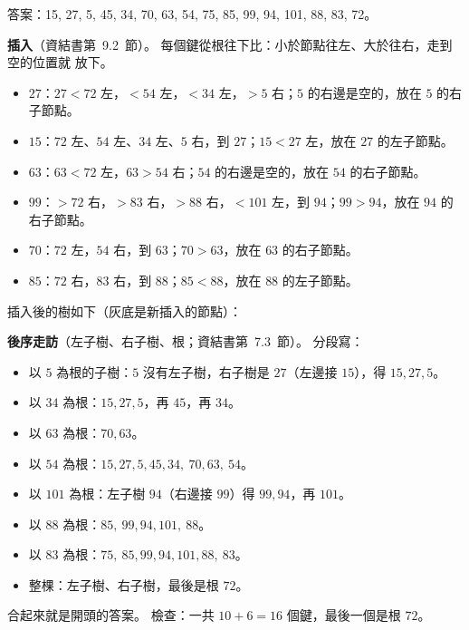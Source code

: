 \begin{pastsoln}
答案：15, 27, 5, 45, 34, 70, 63, 54, 75, 85, 99, 94, 101, 88, 83, 72。

\textbf{插入}（資結書第~9.2~節）。 每個鍵從根往下比：小於節點往左、大於往右，走到空的位置就
放下。
\begin{itemize}
\item $27$：$27 < 72$ 左，$< 54$ 左，$< 34$ 左，$> 5$ 右；$5$ 的右邊是空的，放在 $5$ 的右子節點。
\item $15$：$72$ 左、$54$ 左、$34$ 左、$5$ 右，到 $27$；$15 < 27$ 左，放在 $27$ 的左子節點。
\item $63$：$63 < 72$ 左，$63 > 54$ 右；$54$ 的右邊是空的，放在 $54$ 的右子節點。
\item $99$：$> 72$ 右，$> 83$ 右，$> 88$ 右，$< 101$ 左，到 $94$；$99 > 94$，放在 $94$ 的右子節點。
\item $70$：$72$ 左，$54$ 右，到 $63$；$70 > 63$，放在 $63$ 的右子節點。
\item $85$：$72$ 右，$83$ 右，到 $88$；$85 < 88$，放在 $88$ 的左子節點。
\end{itemize}
插入後的樹如下（灰底是新插入的節點）：
\begin{center}
\end{center}

\textbf{後序走訪}（左子樹、右子樹、根；資結書第~7.3~節）。 分段寫：
\begin{itemize}
\item 以 $5$ 為根的子樹：$5$ 沒有左子樹，右子樹是 $27$（左邊接 $15$），得 $15, 27, 5$。
\item 以 $34$ 為根：$15, 27, 5$，再 $45$，再 $34$。
\item 以 $63$ 為根：$70, 63$。
\item 以 $54$ 為根：$15, 27, 5, 45, 34,\ 70, 63,\ 54$。
\item 以 $101$ 為根：左子樹 $94$（右邊接 $99$）得 $99, 94$，再 $101$。
\item 以 $88$ 為根：$85,\ 99, 94, 101,\ 88$。
\item 以 $83$ 為根：$75,\ 85, 99, 94, 101, 88,\ 83$。
\item 整棵：左子樹、右子樹，最後是根 $72$。
\end{itemize}
合起來就是開頭的答案。 檢查：一共 $10 + 6 = 16$ 個鍵，最後一個是根 $72$。
\end{pastsoln}
